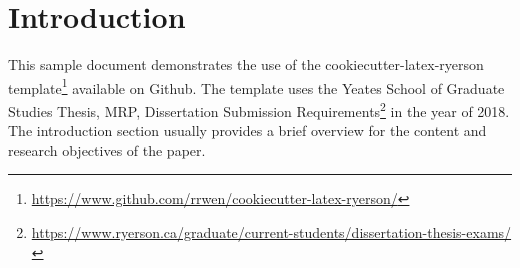 

\chapter*{Introduction} \label{introduction}

This sample document demonstrates the use of the cookiecutter-latex-ryerson template\footnote{\url{https://www.github.com/rrwen/cookiecutter-latex-ryerson/}} available on Github. The template uses the Yeates School of Graduate Studies Thesis, MRP, Dissertation Submission Requirements\footnote{\url{https://www.ryerson.ca/graduate/current-students/dissertation-thesis-exams/}} in the year of 2018. The introduction section usually provides a brief overview for the content and research objectives of the paper.
